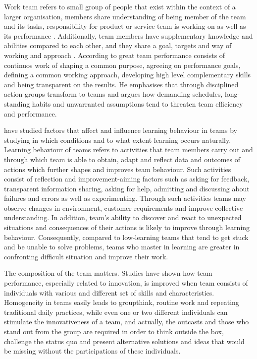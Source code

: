 Work team refers to small group of people that exist within the context of a larger organisation, members share understanding of being member of the team and its tasks, responsibility for product or service team is working on \citep{hackman1987design,alderfer1983intergroup} as well as its performance \citep{edmondson1999psychological}. Additionally, team members have supplementary knowledge and abilities compared to each other, and they share a goal, targets and way of working and approach \citep{edmondson1999psychological}. According to  \citet{katzenbach1993wisdom} great team performance consists of continuos work of shaping a common purpose, agreeing on performance goals, defining a common working approach, developing high level complementary skills and being transparent on the results. He emphasises that through disciplined action groups transform to teams and argues how demanding schedules, long-standing habits and unwarranted assumptions tend to threaten team efficiency and performance.

\citet{edmondson1999psychological} have studied factors that affect and influence learning behaviour in teams by studying in which conditions and to what extent learning occurs naturally. Learning behaviour of teams refers to activities that team members carry out and through which team is able to obtain, adapt and reflect data and outcomes of actions which further shapes and improves team behaviour. Such activities consist of reflection and improvement-aiming factors such as asking for feedback, transparent information sharing, asking for help, admitting and discussing about failures and errors as well as experimenting. Through such activities teams may observe changes in environment, customer requirements and improve collective understanding. In addition, team's ability to discover and react to unexpected situations and consequences of their actions is likely to improve through learning behaviour. Consequently, compared to low-learning teams that tend to get stuck and be unable to solve problems, teams who master in learning are greater in confronting difficult situation and improve their work. \citep{edmondson1999psychological}

The composition of the team matters. Studies have shown how team performance, especially related to innovation, is improved when team consists of individuals with various and different set of skills and characteristics\citep{buijs2007innovation}. Homogeneity in teams easily leads to groupthink, routine work and repeating traditional daily practices, while even one or two different individuals can stimulate the innovativeness of a team, and actually, the outcasts and those who stand out from the group are required in order to think outside the box, challenge the status quo and present alternative solutions and ideas that would be missing without the participations of these individuals. \citep{sternberg1997creativity}


